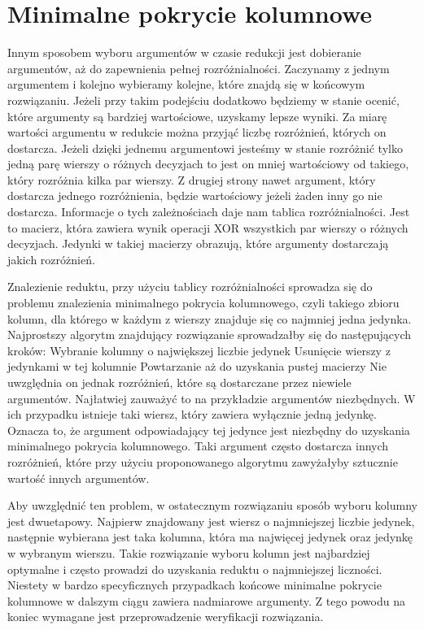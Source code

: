 \section{Minimalne pokrycie kolumnowe}

Innym sposobem wyboru argumentów w czasie redukcji jest dobieranie argumentów, aż do zapewnienia pełnej rozróżnialności. Zaczynamy z jednym argumentem i kolejno wybieramy kolejne, które znajdą się w końcowym rozwiązaniu. Jeżeli przy takim podejściu dodatkowo będziemy w stanie ocenić, które argumenty są bardziej wartościowe, uzyskamy lepsze wyniki.
Za miarę wartości argumentu w redukcie można przyjąć liczbę rozróżnień, których on dostarcza. Jeżeli dzięki jednemu argumentowi jesteśmy w stanie rozróżnić tylko jedną parę wierszy o różnych decyzjach to jest on mniej wartościowy od takiego, który rozróżnia kilka par wierszy. Z drugiej strony nawet argument, który dostarcza jednego rozróżnienia, będzie wartościowy jeżeli żaden inny go nie dostarcza.
Informacje o tych zależnościach daje nam tablica rozróżnialności. Jest to macierz, która zawiera wynik operacji XOR wszystkich par wierszy o różnych decyzjach. Jedynki w takiej macierzy obrazują, które argumenty dostarczają jakich rozróżnień.

Znalezienie reduktu, przy użyciu tablicy rozróżnialności sprowadza się do problemu znalezienia minimalnego pokrycia kolumnowego, czyli takiego zbioru kolumn, dla którego w każdym z wierszy znajduje się co najmniej jedna jedynka. Najprostszy algorytm znajdujący rozwiązanie sprowadzałby się do następujących kroków:
Wybranie kolumny o największej liczbie jedynek
Usunięcie wierszy z jedynkami w tej kolumnie
Powtarzanie aż do uzyskania pustej macierzy
Nie uwzględnia on jednak rozróżnień, które są dostarczane przez niewiele argumentów. Najłatwiej zauważyć to na przykładzie argumentów niezbędnych. W ich przypadku istnieje taki wiersz, który zawiera wyłącznie jedną jedynkę. Oznacza to, że argument odpowiadający tej jedynce jest niezbędny do uzyskania minimalnego pokrycia kolumnowego. Taki argument często dostarcza innych rozróżnień, które przy użyciu proponowanego algorytmu zawyżałyby sztucznie wartość innych argumentów.

Aby uwzględnić ten problem, w ostatecznym rozwiązaniu sposób wyboru kolumny jest dwuetapowy. Najpierw znajdowany jest wiersz o najmniejszej liczbie jedynek, następnie wybierana jest taka kolumna, która ma najwięcej jedynek oraz jedynkę w wybranym wierszu. Takie rozwiązanie wyboru kolumn jest najbardziej optymalne i często prowadzi do uzyskania reduktu o najmniejszej liczności. Niestety w bardzo specyficznych przypadkach końcowe minimalne pokrycie kolumnowe w dalszym ciągu zawiera nadmiarowe argumenty. Z tego powodu na koniec wymagane jest przeprowadzenie weryfikacji rozwiązania.

